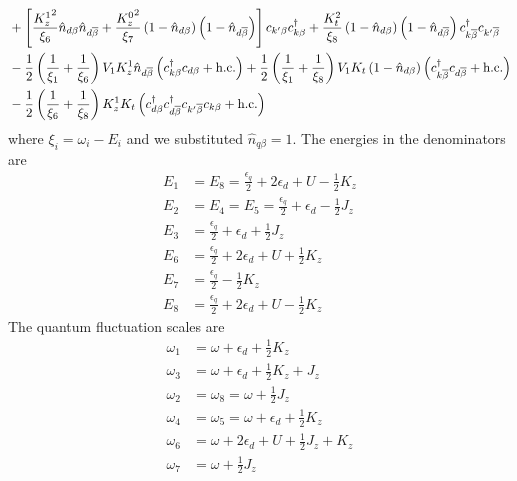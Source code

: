 \documentclass[12pt,twoside]{article}
\numberwithin{equation}{section}
\begin{document}
\begin{equation}
\begin{aligned}
&+ \left[\frac{{K_z^1}^2}{\xi_6}\hat n_{d\beta}\hat n_{d\overline\beta} + \frac{{K_z^0}^2}{\xi_7}\left(1 - \hat n_{d\beta}\right)\left(1 - \hat n_{d\overline\beta}\right)\right]c_{k^\prime\beta}c^\dagger_{k\beta} + \frac{K_t^2}{\xi_8}\left(1 - \hat n_{d\beta}\right)\left(1 - \hat n_{d\overline\beta}\right)c^\dagger_{k\overline\beta}c_{k^\prime\overline\beta}\\
&- \frac{1}{2}\left(\frac{1}{\xi_1} + \frac{1}{\xi_6} \right)V_1 K_z^1 \hat n_{d\overline\beta}\left(c^\dagger_{k\beta}c_{d\beta} + \text{h.c.}\right) + \frac{1}{2}\left(\frac{1}{\xi_1} + \frac{1}{\xi_8} \right)V_1 K_t \left(1 - \hat n_{d\beta}\right)\left(c^\dagger_{k\overline\beta}c_{d\overline\beta} + \text{h.c.}\right)\\
&- \frac{1}{2}\left(\frac{1}{\xi_6} + \frac{1}{\xi_8} \right)K_z^1 K_t \left(c^\dagger_{d\beta}c^\dagger_{d\overline\beta}c_{k^\prime\overline\beta}c_{k\beta} + \text{h.c.}\right)
\end{aligned}\end{equation}
where \(\xi_i = \omega_i - E_i\) and we substituted \(\hat n_{q\beta}=1\). The energies in the denominators are
\begin{equation}\begin{aligned}
E_1&= E_8 = \frac{\epsilon_q}{2} + 2\epsilon_d+ U - \frac{1}{2}K_z\\
E_2& = E_4 = E_5 = \frac{\epsilon_q}{2} + \epsilon_d - \frac{1}{2}J_z\\
E_3&=\frac{\epsilon_q}{2} + \epsilon_d + \frac{1}{2}J_z\\
E_6&=\frac{\epsilon_q}{2} + 2\epsilon_d+ U + \frac{1}{2}K_z\\
E_7&=\frac{\epsilon_q}{2} - \frac{1}{2}K_z\\
E_8&=\frac{\epsilon_q}{2}+2\epsilon_d+ U  - \frac{1}{2}K_z
\end{aligned}\end{equation}
The quantum fluctuation scales are
\begin{equation}\begin{aligned}
	\omega_1&=\omega + \epsilon_d+\frac{1}{2}K_z\\
	\omega_3&=\omega+\epsilon_d + \frac{1}{2}K_z + J_z\\
\omega_2& = \omega_8 = \omega+\frac{1}{2}J_z\\
\omega_4&= \omega_5 = \omega + \epsilon_d + \frac{1}{2}K_z\\
\omega_6&=\omega+2\epsilon_d+U+\frac{1}{2}J_z + K_z\\
\omega_7&=\omega+\frac{1}{2}J_z\\
\end{aligned}\end{equation}
\end{document}
